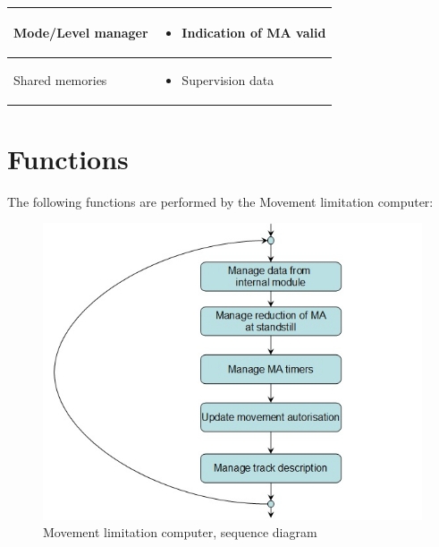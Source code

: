\documentclass[nocc]{template/openetcs_report}
\begin{document}
\begin{longtable}{|l|l|}
				\hline	

					\begin{minipage}[t]{0.35\linewidth} Mode/Level manager 	\end{minipage} 
				&	\begin{minipage}[t]{0.65\linewidth}
						\begin{itemize}
							\item Indication of MA valid
						\end{itemize}			
					\end{minipage} \\
				
				\hline
				
					\begin{minipage}[t]{0.35\linewidth} Shared memories	\end{minipage} 
				&	\begin{minipage}[t]{0.65\linewidth}
						\begin{itemize}
							\item Supervision data
						\end{itemize}				
					\end{minipage} \\
				
				\hline	
			\end{longtable}
\newpage				
\section{Functions}
The following functions are performed by the Movement limitation computer:
\begin{figure}[!h]
  \centering
  \includegraphics[width=\textwidth]{image/evc_mvmt_limitation_computer}
  \caption{Movement limitation computer, sequence diagram}
  \label{fig:Movement limitation computer, sequence diagram}
\end{figure}
\end{document}
